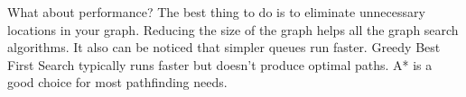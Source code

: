 \documentclass[a4paper]{article}
\begin{document}
\noindent What about performance? The best thing to do is to eliminate unnecessary locations in your graph. Reducing the size of the graph helps all the graph search algorithms. It also can be noticed that simpler queues run faster. Greedy Best First Search typically runs faster but doesn’t produce optimal paths. A* is a good choice for most pathfinding needs.

\newpage



%

%

\end{document}

